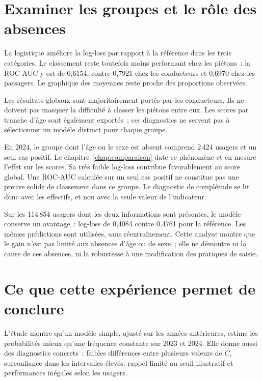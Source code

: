 \section{Examiner les groupes et le rôle des absences}

La logistique améliore la log-loss par rapport à la référence dans les trois
catégories. Le classement reste toutefois moins performant chez les piétons~:
la ROC-AUC y est de 0,6154, contre 0,7921 chez les conducteurs et 0,6970 chez les
passagers. Le graphique des moyennes reste proche des proportions observées.

Les résultats globaux sont majoritairement portés par les conducteurs. Ils ne doivent
pas masquer la difficulté à classer les piétons entre eux. Les scores par tranche
d'âge sont également exportés~; ces diagnostics ne servent pas à sélectionner un
modèle distinct pour chaque groupe.

En 2024, le groupe dont l'âge ou le sexe est absent comprend 2\,424 usagers et un
seul cas positif. Le chapitre~\ref{chap:comparaison} date ce phénomène et en mesure
l'effet sur les scores. Sa très faible log-loss contribue favorablement au score global.
Une ROC-AUC calculée sur un seul cas positif ne constitue pas une preuve solide
de classement dans ce groupe. Le diagnostic de complétude se lit donc avec les
effectifs, et non avec la seule valeur de l'indicateur.

Sur les 114\,854 usagers dont les deux informations sont présentes, le modèle conserve
un avantage~: log-loss de 0,4084 contre 0,4761 pour la référence. Les mêmes prédictions
sont utilisées, sans réentraînement. Cette analyse montre que le gain n'est pas limité
aux absences d'âge ou de sexe~; elle ne démontre ni la cause de ces absences, ni la
robustesse à une modification des pratiques de saisie.

\section{Ce que cette expérience permet de conclure}
L'étude montre qu'un modèle simple, ajusté sur les années antérieures, estime les
probabilités mieux qu'une fréquence constante sur 2023 et 2024. Elle donne aussi
des diagnostics concrets~: faibles différences entre plusieurs valeurs de $C$,
surconfiance dans les intervalles élevés, rappel limité au seuil illustratif et
performances inégales selon les usagers.

